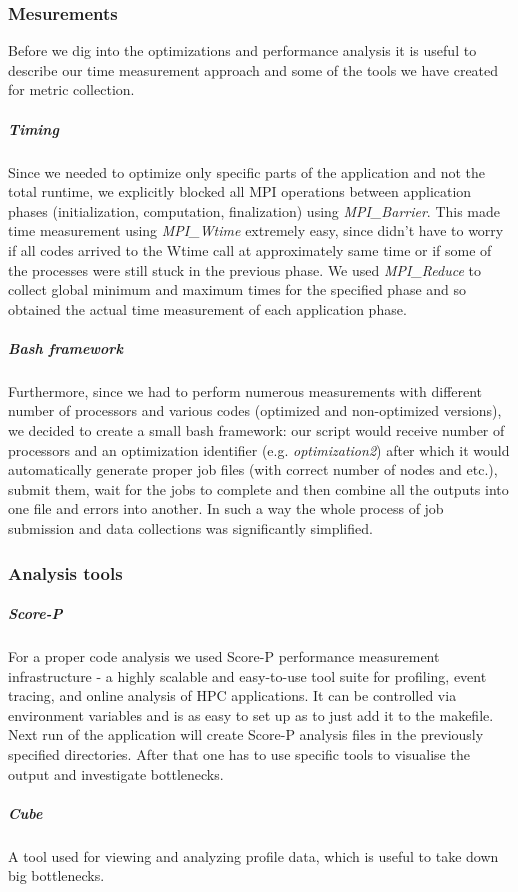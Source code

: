 \documentclass{article}
\begin{document}
\subsubsection{Mesurements}
Before we dig into the optimizations and performance analysis it is useful to describe our time measurement approach and some of the tools we have created for metric collection. 

\subparagraph{Timing}
Since we needed to optimize only specific parts of the application and not the total runtime, we explicitly blocked all MPI operations between application phases (initialization, computation, finalization) using \textit{MPI\_Barrier}. This made time measurement using \textit{MPI\_Wtime} extremely easy, since didn't have to worry if all codes arrived to the Wtime call at approximately same time or if some of the processes were still stuck in the previous phase. We used \textit{MPI\_Reduce} to collect global minimum and maximum times for the specified phase and so obtained the actual time measurement of each application phase.

\subparagraph{Bash framework}
Furthermore, since we had to perform numerous measurements with different number of processors and various codes (optimized and non-optimized versions), we decided to create a small bash framework: our script would receive number of processors and an optimization identifier (e.g. \textit{optimization2}) after which it would automatically generate proper job files (with correct number of nodes and etc.), submit them, wait for the jobs to complete and then combine all the outputs into one file and errors into another. In such a way the whole process of job submission and data collections was significantly simplified.

\subsubsection{Analysis tools}

\subparagraph{Score-P}
For a proper code analysis we used Score-P performance measurement infrastructure - a highly scalable and easy-to-use tool suite for profiling, event tracing, and online analysis of HPC applications. It can be controlled via environment variables and is as easy to set up as to just add it to the makefile. Next run of the application will create Score-P analysis files in the previously specified directories. After that one has to use specific tools to visualise the output and investigate bottlenecks.

\subparagraph{Cube}
A tool used for viewing and analyzing profile data, which is useful to take down big bottlenecks. 
\end{document}
